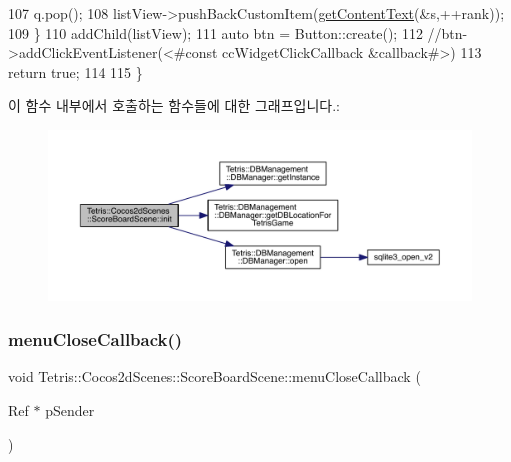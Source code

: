 \begin{DoxyCode}
107                         q.pop();
108                         listView->pushBackCustomItem(\hyperlink{class_tetris_1_1_cocos2d_scenes_1_1_score_board_scene_a1fa0140e51fbae6cffb210487073b549}{getContentText}(&s,++rank));
109                     \}
110                     addChild(listView);
111                     \textcolor{keyword}{auto} btn = Button::create();
112                     \textcolor{comment}{//btn->addClickEventListener(<#const ccWidgetClickCallback &callback#>)}
113                     \textcolor{keywordflow}{return} \textcolor{keyword}{true};
114                     
115                 \}
\end{DoxyCode}
이 함수 내부에서 호출하는 함수들에 대한 그래프입니다.\+:
\nopagebreak
\begin{figure}[H]
\begin{center}
\leavevmode
\includegraphics[width=350pt]{dc/dc7/class_tetris_1_1_cocos2d_scenes_1_1_score_board_scene_a348c50d4213a4fee3888c216c16712ef_cgraph}
\end{center}
\end{figure}
\mbox{\label{class_tetris_1_1_cocos2d_scenes_1_1_score_board_scene_ad17f53b26718969718fed03b2b38ff61}} 
\subsubsection{\texorpdfstring{menu\+Close\+Callback()}{menuCloseCallback()}}
{\footnotesize\ttfamily void Tetris\+::\+Cocos2d\+Scenes\+::\+Score\+Board\+Scene\+::menu\+Close\+Callback (\begin{DoxyParamCaption}\item[{Ref $\ast$}]{p\+Sender }\end{DoxyParamCaption})\hspace{0.3cm}{\ttfamily [inline]}}



